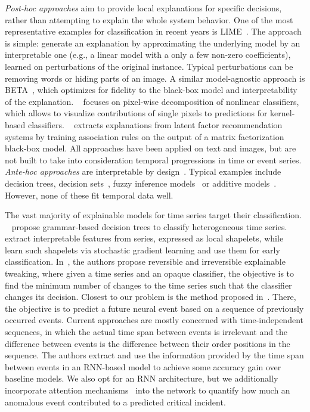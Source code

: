 \documentclass[letterpaper]{article} %
\begin{document}
\vspace{-1.58mm}
\vspace{-3.15mm}
\textit{Post-hoc approaches} aim to provide local explanations for specific decisions, rather than attempting to explain the whole system behavior. One of the most representative examples for classification in recent years is LIME~\cite{lime}. The approach is simple: generate an explanation by approximating the underlying model by an interpretable one (e.g., a linear model with a only a few non-zero coefficients), learned on perturbations of the original instance. Typical perturbations can be removing words or hiding parts of an image. A similar model-agnostic approach is BETA~\cite{approximations}, which optimizes for fidelity to the black-box model and interpretability of the explanation. ~\cite{layerwise} focuses on pixel-wise decomposition of nonlinear classifiers, which allows to visualize contributions of single pixels to predictions for kernel-based classifiers. ~\cite{mining} extracts explanations from latent factor recommendation systems by training association rules on the output of a matrix factorization black-box model. All approaches have been applied on text and images, but are not built to take into consideration temporal progressions in time or event series.  \textit{Ante-hoc approaches} are interpretable by design~\cite{nphard}. Typical examples include decision trees, decision sets~\cite{decisionsets,anchors}, fuzzy inference models~\cite{pairwise} or additive models~\cite{additive}. However, none of these fit temporal data well.

\vspace{-1.28mm}
\vspace{-2.56mm}
\vspace{-6.20mm}
The vast majority of explainable models for time series target their classification. ~\cite{categorization} propose grammar-based decision trees to classify heterogeneous time series.
~\cite{earlyclass,shapelets} extract interpretable features from series, expressed as local shapelets, while ~\cite{dtw} learn such shapelets via stochastic gradient learning and use them for early classification. In~\cite{irreversible}, the authors propose reversible and irreversible explainable tweaking, where given a time series and an opaque classifier, the objective is to find the minimum number of changes to the time series such that the classifier changes its decision.  Closest to our problem is the method proposed in~\cite{iclr2018}. There, the objective is to predict a future neural event based on a sequence of previously occurred events. Current approaches are mostly concerned with time-independent sequences, in which the actual time span between events is irrelevant and the difference between events is the difference between their order positions in the sequence. The authors extract and use the information provided by the time span between events in an RNN-based model to achieve some accuracy gain over baseline models. We also opt for an RNN architecture, but we additionally incorporate attention mechanisms~\cite{attention} into the network to quantify how much an anomalous event contributed to a predicted critical incident.
\end{document}
